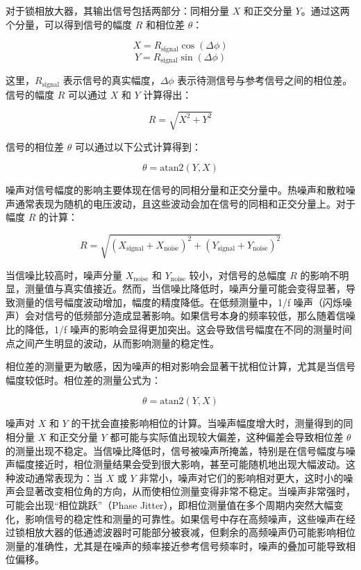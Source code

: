对于锁相放大器，其输出信号包括两部分：同相分量 \( X \) 和正交分量 \( Y \)。通过这两个分量，可以得到信号的幅度 \( R \) 和相位差 \( \theta \)：

\[
X = R_{\text{signal}} \cos(\Delta \phi)
\]
\[
Y = R_{\text{signal}} \sin(\Delta \phi)
\]

这里，\( R_{\text{signal}} \) 表示信号的真实幅度，\( \Delta \phi \) 表示待测信号与参考信号之间的相位差。信号的幅度 \( R \) 可以通过 \( X \) 和 \( Y \) 计算得出：

\[
R = \sqrt{X^2 + Y^2}
\]

信号的相位差 \( \theta \) 可以通过以下公式计算得到：

\[
\theta = \text{atan2}(Y, X)
\]

噪声对信号幅度的影响主要体现在信号的同相分量和正交分量中。热噪声和散粒噪声通常表现为随机的电压波动，且这些波动会加在信号的同相和正交分量上。对于幅度 \( R \) 的计算：

\[
R = \sqrt{(X_{\text{signal}} + X_{\text{noise}})^2 + (Y_{\text{signal}} + Y_{\text{noise}})^2}
\]

当信噪比较高时，噪声分量 \( X_{\text{noise}} \) 和 \( Y_{\text{noise}} \) 较小，对信号的总幅度 \( R \) 的影响不明显，测量值与真实值接近。然而，当信噪比降低时，噪声分量可能会变得显著，导致测量的信号幅度波动增加，幅度的精度降低。在低频测量中，1/f 噪声（闪烁噪声）会对信号的低频部分造成显著影响。如果信号本身的频率较低，那么随着信噪比的降低，1/f 噪声的影响会显得更加突出。这会导致信号幅度在不同的测量时间点之间产生明显的波动，从而影响测量的稳定性。

相位差的测量更为敏感，因为噪声的相对影响会显著干扰相位计算，尤其是当信号幅度较低时。相位差的测量公式为：

\[
\theta = \text{atan2}(Y, X)
\]

噪声对 \( X \) 和 \( Y \) 的干扰会直接影响相位的计算。当噪声幅度增大时，测量得到的同相分量 \( X \) 和正交分量 \( Y \) 都可能与实际值出现较大偏差，这种偏差会导致相位差 \( \theta \) 的测量出现不稳定。当信噪比降低时，信号被噪声所掩盖，特别是在信号幅度与噪声幅度接近时，相位测量结果会受到很大影响，甚至可能随机地出现大幅波动。这种波动通常表现为：当 \( X \) 或 \( Y \) 非常小，噪声对它们的影响相对更大，这时小的噪声会显著改变相位角的方向，从而使相位测量变得非常不稳定。当噪声非常强时，可能会出现“相位跳跃”（Phase Jitter），即相位测量值在多个周期内突然大幅变化，影响信号的稳定性和测量的可靠性。如果信号中存在高频噪声，这些噪声在经过锁相放大器的低通滤波器时可能部分被衰减，但剩余的高频噪声仍可能影响相位测量的准确性，尤其是在噪声的频率接近参考信号频率时，噪声的叠加可能导致相位偏移。

